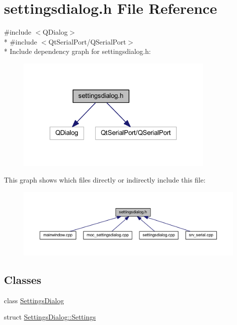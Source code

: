 \hypertarget{a00132}{\section{settingsdialog.\+h File Reference}
\label{a00132}
}
{\ttfamily \#include $<$Q\+Dialog$>$}\\*
{\ttfamily \#include $<$Qt\+Serial\+Port/\+Q\+Serial\+Port$>$}\\*
Include dependency graph for settingsdialog.\+h\+:
\nopagebreak
\begin{figure}[H]
\begin{center}
\leavevmode
\includegraphics[width=272pt]{d8/d8e/a00344}
\end{center}
\end{figure}
This graph shows which files directly or indirectly include this file\+:
\nopagebreak
\begin{figure}[H]
\begin{center}
\leavevmode
\includegraphics[width=350pt]{d9/d48/a00345}
\end{center}
\end{figure}
\subsection*{Classes}
\begin{DoxyCompactItemize}
\item 
class \hyperlink{a00075}{Settings\+Dialog}
\item 
struct \hyperlink{a00075_dc/d9a/a00218}{Settings\+Dialog\+::\+Settings}
\end{DoxyCompactItemize}
